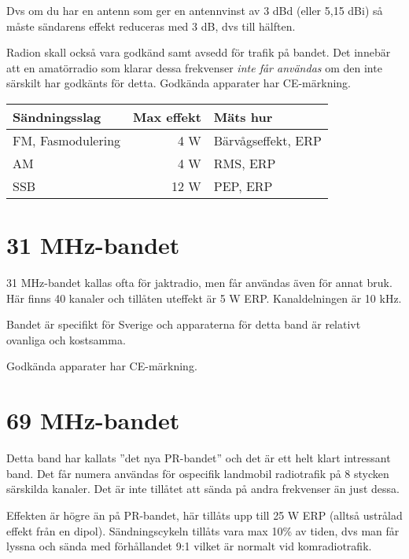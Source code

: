 \documentclass[12ypt,swedish,a4paper]{report}
\begin{document}

Dvs om du har en antenn som ger en antennvinst av 3 dBd (eller 5,15 dBi) så måste sändarens effekt reduceras med 3 dB, dvs till hälften.

Radion skall också vara godkänd samt avsedd för trafik på bandet. Det innebär att en amatörradio som klarar dessa frekvenser \textit{inte får användas} om den inte särskilt har godkänts för detta. Godkända apparater har CE-märkning.

\begin{table}[h]
\begin{tabular}{lrl}
	Sändningsslag     & Max effekt & Mäts hur           \\ \hline
	FM, Fasmodulering &        4 W & Bärvågseffekt, ERP \\
	AM                &        4 W & RMS, ERP           \\
	SSB               &       12 W & PEP, ERP
\end{tabular}
\end{table}

\section{31 MHz-bandet}

31 MHz-bandet kallas ofta för jaktradio, men får användas även för annat bruk.
Här finns 40 kanaler och tillåten uteffekt är 5 W ERP. Kanaldelningen är 10 kHz.

Bandet är specifikt för Sverige och apparaterna för detta band är relativt ovanliga och kostsamma.

Godkända apparater har CE-märkning.

\section{69 MHz-bandet}

Detta band har kallats ''det nya PR-bandet'' och det är ett helt klart intressant band. Det får numera användas för ospecifik landmobil radiotrafik på 8 stycken särskilda kanaler. Det är inte tillåtet att sända på andra frekvenser än just dessa.

Effekten är högre än på PR-bandet, här tillåts upp till 25 W ERP (alltså ustrålad effekt från en dipol). Sändningscykeln tillåts vara max 10\% av tiden, dvs man får lyssna och sända med förhållandet 9:1 vilket är normalt vid komradiotrafik.
\end{document}
